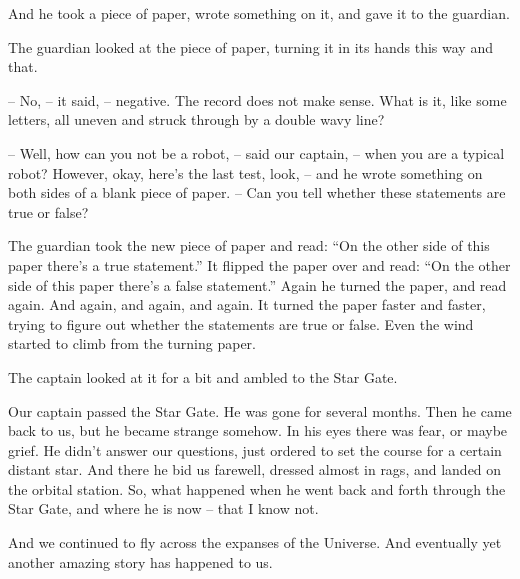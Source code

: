 \documentclass[ebook,oneside,final,openright]{memoir}
\begin{document}
And he took a piece of paper, wrote something on it, and gave it to the guardian.\par
The guardian looked at the piece of paper, turning it in its hands this way and that.\par
– No, – it said, – negative. The record does not make sense. What is it, like some letters, all uneven and struck through by a double wavy line?\par
– Well, how can you not be a robot, – said our captain, – when you are a typical robot? However, okay, here’s the last test, look, – and he wrote something on both sides of a blank piece of paper. – Can you tell whether these statements are true or false?\par
\par
The guardian took the new piece of paper and read: “On the other side of this paper there’s a true statement.” It flipped the paper over and read: “On the other side of this paper there’s a false statement.” Again he turned the paper, and read again. And again, and again, and again. It turned the paper faster and faster, trying to figure out whether the statements are true or false. Even the wind started to climb from the turning paper.\par
\par
The captain looked at it for a bit and ambled to the Star Gate.\par
Our captain passed the Star Gate. He was gone for several months. Then he came back to us, but he became strange somehow. In his eyes there was fear, or maybe grief. He didn’t answer our questions, just ordered to set the course for a certain distant star. And there he bid us farewell, dressed almost in rags, and landed on the orbital station. So, what happened when he went back and forth through the Star Gate, and where he is now – that I know not. \par
\par
 And we continued to fly across the expanses of the Universe. And eventually yet another amazing story has happened to us.
\end{document}
